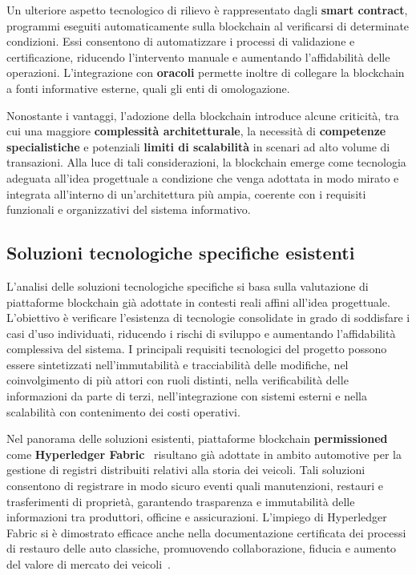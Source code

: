 Un ulteriore aspetto tecnologico di rilievo è rappresentato dagli \textbf{smart contract}, programmi eseguiti automaticamente sulla blockchain al verificarsi di determinate condizioni. Essi consentono di automatizzare i processi di validazione e certificazione, riducendo l'intervento manuale e aumentando l'affidabilità delle operazioni. L'integrazione con \textbf{oracoli} permette inoltre di collegare la blockchain a fonti informative esterne, quali gli enti di omologazione.

Nonostante i vantaggi, l'adozione della blockchain introduce alcune criticità, tra cui una maggiore \textbf{complessità architetturale}, la necessità di \textbf{competenze specialistiche} e potenziali \textbf{limiti di scalabilità} in scenari ad alto volume di transazioni. Alla luce di tali considerazioni, la blockchain emerge come tecnologia adeguata all'idea progettuale a condizione che venga adottata in modo mirato e integrata all'interno di un'architettura più ampia, coerente con i requisiti funzionali e organizzativi del sistema informativo.

\subsection{Soluzioni tecnologiche specifiche esistenti}

L'analisi delle soluzioni tecnologiche specifiche si basa sulla valutazione di piattaforme blockchain già adottate in contesti reali affini all'idea progettuale. L'obiettivo è verificare l'esistenza di tecnologie consolidate in grado di soddisfare i casi d'uso individuati, riducendo i rischi di sviluppo e aumentando l'affidabilità complessiva del sistema. I principali requisiti tecnologici del progetto possono essere sintetizzati nell'immutabilità e tracciabilità delle modifiche, nel coinvolgimento di più attori con ruoli distinti, nella verificabilità delle informazioni da parte di terzi, nell'integrazione con sistemi esterni e nella scalabilità con contenimento dei costi operativi.

Nel panorama delle soluzioni esistenti, piattaforme blockchain \textbf{permissioned} come \textbf{Hyperledger Fabric}~\cite{hyperledger} risultano già adottate in ambito automotive per la gestione di registri distribuiti relativi alla storia dei veicoli. Tali soluzioni consentono di registrare in modo sicuro eventi quali manutenzioni, restauri e trasferimenti di proprietà, garantendo trasparenza e immutabilità delle informazioni tra produttori, officine e assicurazioni. L'impiego di Hyperledger Fabric si è dimostrato efficace anche nella documentazione certificata dei processi di restauro delle auto classiche, promuovendo collaborazione, fiducia e aumento del valore di mercato dei veicoli~\cite{murta2024}.

